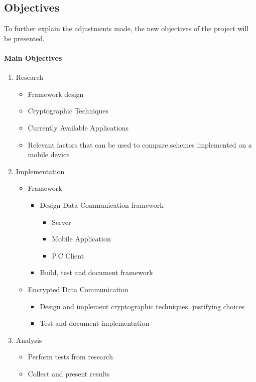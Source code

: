 \documentclass[a4paper,11pt]{article}
\begin{document}
\subsection{Objectives}

To further explain the adjustments made, the new objectives of the project will be presented.

\paragraph{Main Objectives}
\begin{enumerate}
  \item Research
  \begin{itemize}
    \item Framework design
    \item Cryptographic Techniques
    \item Currently Available Applications
    \item Relevant factors that can be used to compare schemes implemented on a mobile device
  \end{itemize}
  \item Implementation
  \begin{itemize}
    \item Framework
    \begin{itemize} 
      \item Design Data Communication framework
      \begin{itemize}
        \item Server
        \item Mobile Application
        \item P.C Client
      \end{itemize}
      \item Build, test and document framework
    \end{itemize}
  \item Encrypted Data Communication
  \begin{itemize}
    \item Design and implement cryptographic techniques, justifying choices
    \item Test and document implementation
  \end{itemize}
  \end{itemize}
  \item Analysis
  \begin{itemize}
    \item Perform tests from research
    \item Collect and present results

\end{itemize}
\end{enumerate}
\end{document}
